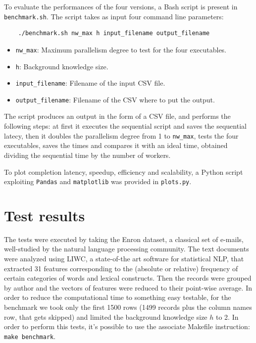 \documentclass[a4paper]{article}
\begin{document}
To evaluate the performances of the four versions, a Bash script is present in \texttt{benchmark.sh}. The script takes as input four command line parameters:
\begin{verbatim}
    ./benchmark.sh nw_max h input_filename output_filename
\end{verbatim}
\begin{itemize}
    \item \texttt{nw\_max}: Maximum parallelism degree to test for the four executables.
    \item \texttt{h}: Background knowledge size.
    \item \texttt{input\_filename}: Filename of the input CSV file.
    \item \texttt{output\_filename}: Filename of the CSV where to put the output.
\end{itemize}
The script produces an output in the form of a CSV file, and performs the following steps: at first it executes the sequential script and saves the sequential latecy, then it doubles the parallelism degree from 1 to \texttt{nw\_max}, tests the four executables, saves the times and compares it with an ideal time, obtained dividing the sequential time by the number of workers.

To plot completion latency, speedup, efficiency and scalability, a Python script exploiting \texttt{Pandas} and \texttt{matplotlib} was provided in \texttt{plots.py}.

\section{Test results}

The tests were executed by taking the Enron dataset, a classical set of e-mails, well-studied by the natural language processing community. The text documents were analyzed using LIWC, a state-of-the art software for statistical NLP, that extracted 31 features corresponding to the (absolute or relative) frequency of certain categories of words and lexical constructs. Then the records were grouped by author and the vectors of features were reduced to their point-wise average. In order to reduce the computational time to something easy testable, for the benchmark we took only the first 1500 rows (1499 records plus the column names row, that gets skipped) and limited the background knowledge size $h$ to 2. In order to perform this tests, it's possible to use the associate Makefile instruction: \texttt{make benchmark}.
\end{document}
